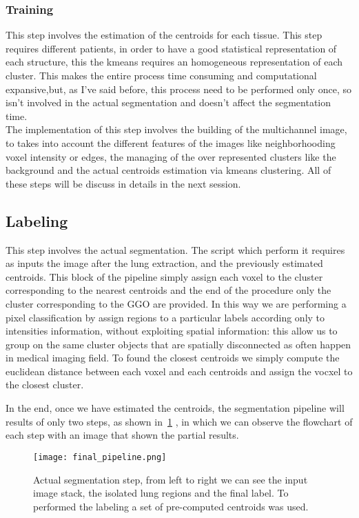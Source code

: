 \documentclass{standalone}
\begin{document}
	\subsubsection*{Training}
	
	This step involves the estimation of the centroids for each tissue. This step requires different patients, in order to have a good statistical representation of each structure, this the kmeans requires an homogeneous representation of each cluster. This makes the entire process time consuming and computational expansive,but, as I've said before, this process need to be performed only once, so isn't involved in the actual segmentation and doesn't affect the segmentation time.\\ The implementation of this step involves the building of the multichannel image, to takes into account the different features of the images like neighborhooding voxel intensity or edges, the managing of the over represented clusters like the background and the actual centroids estimation via kmeans clustering. All of these steps will be discuss in details in the next session.

	
	\subsection*{Labeling}
	
	This step involves the actual segmentation. The script which perform it requires as inputs the image after the lung extraction, and the previously estimated centroids. This block of the pipeline simply assign each voxel to the cluster corresponding to the nearest centroids and the end of the procedure only the cluster corresponding to the GGO are provided. In this way we are performing a pixel classification by assign regions to a particular labels according only to intensities information, without exploiting spatial information: this allow us to group on the same cluster objects that are spatially disconnected as often happen in medical imaging field. 
	To found the closest centroids we simply compute the euclidean distance between each voxel and each centroids and assign the vocxel to the closest cluster.
	
	In the end, once we have estimated the centroids, the segmentation pipeline will results of only two steps, as shown in \figurename\,\ref{fig:FinalPipeline} , in which we can observe the flowchart of each step with an image that shown the partial results.
	
	
	\begin{figure}\label{fig:FinalPipeline}
		\centering
			\texttt{[image: final\_pipeline.png]}
			\caption{Actual segmentation step, from left to right we can see the input image stack, the isolated lung regions and the final label. To performed the labeling a set of pre-computed centroids was used.}
	\end{figure}
	
	
	
\end{document}
